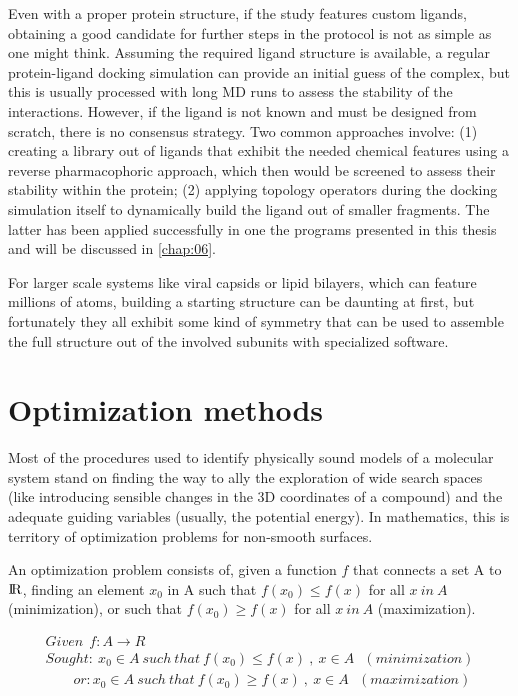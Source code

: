 Even with a proper protein structure, if the study features custom ligands, obtaining a good candidate for further steps in the protocol is not as simple as one might think. Assuming the required ligand structure is available, a regular protein-ligand docking simulation can provide an initial guess of the complex, but this is usually processed with long MD runs to assess the stability of the interactions. However, if the ligand is not known and must be designed from scratch, there is no consensus strategy. Two common approaches involve: (1) creating a library out of ligands that exhibit the needed chemical features using a reverse pharmacophoric approach, which then would be screened to assess their stability within the protein; (2) applying topology operators during the docking simulation itself to dynamically build the ligand out of smaller fragments. The latter has been applied successfully in one the programs presented in this thesis and will be discussed in \autoref{chap:06}.

For larger scale systems like viral capsids or lipid bilayers, which can feature millions of atoms, building a starting structure can be daunting at first, but fortunately they all exhibit some kind of symmetry that can be used to assemble the full structure out of the involved subunits with specialized software.\cite{bietz2016siena,sym}

\section{Optimization methods}

Most of the procedures used to identify physically sound models of a molecular system stand on finding the way to ally the exploration of wide search spaces (like introducing sensible changes in the 3D coordinates of a compound) and the adequate guiding variables (usually, the potential energy). In mathematics, this is territory of optimization problems for non-smooth surfaces.

An optimization problem consists of, given a function $ f $ that connects a set A to ${\rm I\!R}$, finding an element $ x_{0} $ in A such that $ f(x_{0}) \leq f(x) $ for all $ x~in~A $  (minimization), or such that $ f(x_{0}) \geq f(x) $ for all $ x~in~A $ (maximization).

\begin{align}
	Given ~~ f:A \rightarrow R \nonumber \\
	Sought: ~ x_{0} \in A ~ such ~ that ~ f(x_{0})  \leq f(x) ~,~x \in A ~~~ ( minimization ) \nonumber \\
	~~~~~~~~~ or: x_{0} \in A ~ such ~ that ~ f(x_{0})  \geq f(x) ~,~x \in A ~~~ ( maximization )
\end{align}

